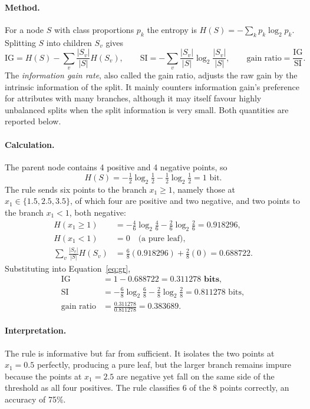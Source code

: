 \documentclass[11pt,a4paper]{article}
\begin{document}
\paragraph{Method.} For a node $S$ with class proportions $p_k$ the entropy is
$H(S) = -\sum_k p_k \log_2 p_k$. Splitting $S$ into children $S_v$ gives
\begin{equation}
\mathrm{IG} = H(S) - \sum_v \frac{|S_v|}{|S|}H(S_v),
\qquad
\mathrm{SI} = -\sum_v \frac{|S_v|}{|S|}\log_2\frac{|S_v|}{|S|},
\qquad
\text{gain ratio} = \frac{\mathrm{IG}}{\mathrm{SI}} .
\label{eq:gr}
\end{equation}
The \emph{information gain rate}, also called the gain ratio, adjusts the raw gain by the
intrinsic information of the split. It mainly counters information gain's preference for
attributes with many branches, although it may itself favour highly unbalanced splits when
the split information is very small. Both quantities are reported below.

\paragraph{Calculation.} The parent node contains 4 positive and 4 negative points, so
\[
H(S) = -\tfrac12\log_2\tfrac12 - \tfrac12\log_2\tfrac12 = 1 \text{ bit.}
\]
The rule sends six points to the branch $x_1 \ge 1$, namely those at
$x_1 \in \{1.5, 2.5, 3.5\}$, of which four are positive and two negative, and two points to
the branch $x_1 < 1$, both negative:
\begin{align*}
H(x_1 \ge 1) &= -\tfrac46\log_2\tfrac46 - \tfrac26\log_2\tfrac26 = 0.918296, \\
H(x_1 < 1)   &= 0 \quad \text{(a pure leaf)}, \\
\sum_v \frac{|S_v|}{|S|}H(S_v) &= \tfrac68(0.918296) + \tfrac28(0) = 0.688722 .
\end{align*}
Substituting into Equation~\eqref{eq:gr},
\begin{align*}
\mathrm{IG} &= 1 - 0.688722 = \mathbf{0.311278 \text{ bits}}, \\
\mathrm{SI} &= -\tfrac68\log_2\tfrac68 - \tfrac28\log_2\tfrac28 = 0.811278 \text{ bits}, \\
\text{gain ratio} &= \frac{0.311278}{0.811278} = \mathbf{0.383689} .
\end{align*}

\paragraph{Interpretation.} The rule is informative but far from sufficient. It isolates
the two points at $x_1 = 0.5$ perfectly, producing a pure leaf, but the larger branch
remains impure because the points at $x_1 = 2.5$ are negative yet fall on the same side of
the threshold as all four positives. The rule classifies 6 of the 8 points correctly, an
accuracy of 75\%.
\end{document}
